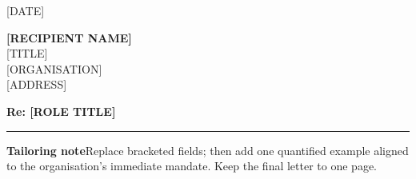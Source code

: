 \documentclass{vitae}
\begin{document}

\vspace{9mm}
{\sffamily\small\color{Slate}[DATE]}\par\vspace{7mm}
{\sffamily\bfseries\color{OxfordBlue}[RECIPIENT NAME]}\\
{\small [TITLE]\\{}[ORGANISATION]\\{}[ADDRESS]}\par\vspace{9mm}
{\sffamily\large\bfseries\color{OxfordBlue}Re: [ROLE TITLE]}\par\vspace{7mm}

\vfill
\color{Mist}\rule{\linewidth}{.6pt}\par\vspace{3mm}
{\sffamily\scriptsize\color{Slate}\textbf{Tailoring note}\quad Replace bracketed fields; then add one quantified example aligned to the organisation's immediate mandate. Keep the final letter to one page.}
\end{document}
